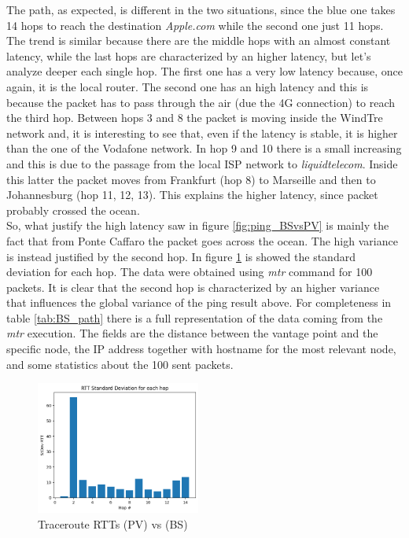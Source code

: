 \documentclass[a4paper,10pt]{article}
\begin{document}
\begin{multicols}{2}
\noindent
The path, as expected, is different in the two situations, since the blue one takes 14 hops to reach the destination \textit{Apple.com} while 
the second one just 11 hops. 
The trend is similar because there are the middle hops with an almost constant latency, while the last hops are characterized by an higher latency, but let's analyze
deeper each single hop. The first one has a very low latency because, once again, it is the local router. The second one has an high latency and this is because
the packet has to pass through the air (due the 4G connection) to reach the third hop. Between hops 3 and 8 the packet is moving inside the WindTre network and, it is
interesting to see that, even if the latency is stable, it is higher than the one of the Vodafone network. In hop 9 and 10 there is a small increasing and this
is due to the passage from the local ISP network to \textit{liquidtelecom}. Inside this latter the packet moves from Frankfurt (hop 8) to Marseille and then
to Johannesburg (hop 11, 12, 13). This explains the higher latency, since packet probably crossed the ocean.\\
So, what justify the high latency saw in figure \ref{fig:ping_BSvsPV} is mainly the fact that from Ponte Caffaro the packet goes across the ocean. The high
variance is instead justified by the second hop. In figure \ref{fig:BS_StDev} is showed the standard deviation for each hop. The data were obtained
using \textit{mtr} command for 100 packets. It is clear that the second hop is characterized by an higher variance that influences the global variance of the ping result above. 
For completeness in table \ref{tab:BS_path} there is a full representation of the data coming from the \textit{mtr} execution. The fields are the 
distance between the vantage point and the specific node, the IP address together with hostname for the most relevant node, and some statistics about the 100
sent packets.

        \begin{figure}[H]
                \centering
                \includegraphics[width=0.48\textwidth]{BS_StDev.png}
                \caption{\small Traceroute RTTs (PV) vs (BS)}
                \label{fig:BS_StDev}
        \end{figure}

\end{multicols}
        
\end{document}
